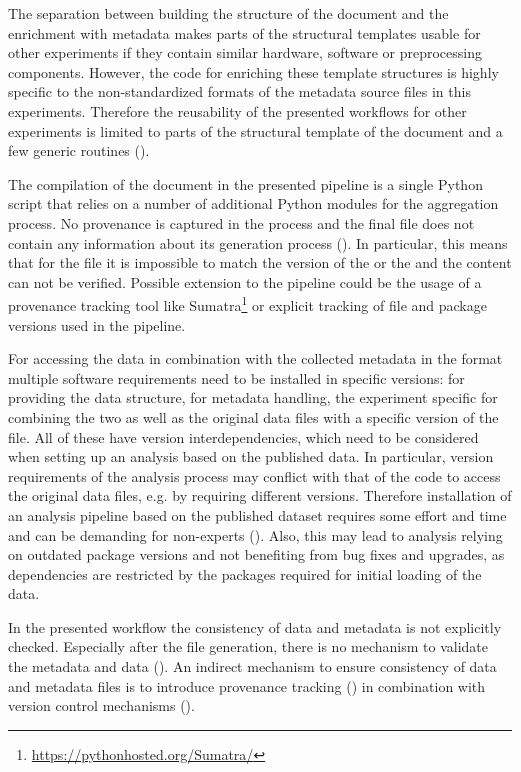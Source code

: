 The separation between building the structure of the  document and the enrichment with metadata makes parts of the structural templates usable for other experiments if they contain similar hardware, software or preprocessing components. However, the code for enriching these template structures is highly specific to the non-standardized formats of the metadata source files in this experiments. Therefore the reusability of the presented workflows for other experiments is limited to parts of the structural template of the  document and a few generic routines ().

The compilation of the  document in the presented pipeline is a single Python script that relies on a number of additional Python modules for the aggregation process. No provenance is captured in the process and the final  file does not contain any information about its generation process (). In particular, this means that for the  file it is impossible to match the version of the  or the  and the content can not be verified. Possible extension to the pipeline could be the usage of a provenance tracking tool like Sumatra\footnote{\url{https://pythonhosted.org/Sumatra/}} or explicit tracking of file and package versions used in the pipeline.

For accessing the data in combination with the collected metadata in the  format multiple software requirements need to be installed in specific versions:  for providing the data structure,  for metadata handling, the experiment specific  for combining the two as well as the original data files with a specific version of the  file. All of these have version interdependencies, which need to be considered when setting up an analysis based on the published data. In particular, version requirements of the analysis process may conflict with that of the code to access the original data files, e.g. by requiring different  versions. Therefore installation of an analysis pipeline based on the published dataset requires some effort and time and can be demanding for non-experts (). Also, this may lead to analysis relying on outdated package versions and not benefiting from bug fixes and upgrades, as dependencies are restricted by the packages required for initial loading of the data.

In the presented workflow the consistency of data and metadata is not explicitly checked. Especially after the  file generation, there is no mechanism to validate the metadata and data (). An indirect mechanism to ensure consistency of data and metadata files is to introduce provenance tracking () in combination with version control mechanisms ().

